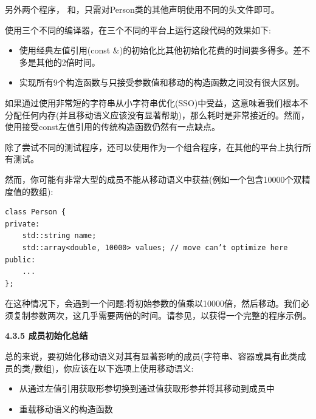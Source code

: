 另外两个程序， {\color{red}{basics/initallperf.cpp}}和{\color{red}{basics/initmoveperf.cpp}}，只需对Person类的其他声明使用不同的头文件即可。

使用三个不同的编译器，在三个不同的平台上运行这段代码的效果如下:\par

\begin{itemize}
	\item 使用经典左值引用(const \&)的初始化比其他初始化花费的时间要多得多。差不多是其他的2倍时间。
	\item 实现所有9个构造函数与只接受参数值和移动的构造函数之间没有很大区别。
\end{itemize}

如果通过使用非常短的字符串从小字符串优化(SSO)中受益，这意味着我们根本不分配任何内存(并且移动语义应该没有显著帮助)，那么耗时是非常接近的。然而，使用接受const左值引用的传统构造函数仍然有一点缺点。\par

除了尝试不同的测试程序，还可以使用{\color{red}{basics/initperf.cpp}}作为一个组合程序，在其他的平台上执行所有测试。\par

然而，你可能有非常大型的成员不能从移动语义中获益(例如一个包含10000个双精度值的数组):\par
 
\begin{lstlisting}[caption={}]
class Person {
private:
	std::string name;
	std::array<double, 10000> values; // move can’t optimize here
public:
	...
};
\end{lstlisting}

在这种情况下，会遇到一个问题:将初始参数的值乘以10000倍，然后移动。我们必须复制参数两次，这几乎需要两倍的时间。请参见{\color{red}{basics/initbigper .cpp}}，以获得一个完整的程序示例。\par

\hspace*{\fill} \par %
\textbf{4.3.5 成员初始化总结}

总的来说，要初始化移动语义对其有显著影响的成员(字符串、容器或具有此类成员的类/数组)，你应该在以下选项上使用移动语义:\par

\begin{itemize}
	\item 从通过左值引用获取形参切换到通过值获取形参并将其移动到成员中
	\item 重载移动语义的构造函数
\end{itemize}

